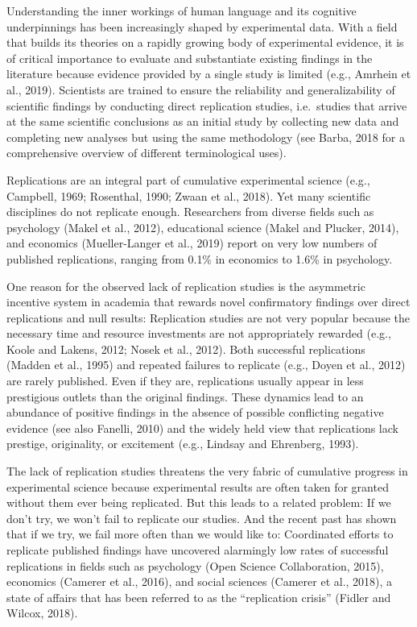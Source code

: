 \documentclass[]{elsarticle} %
\begin{document}
Understanding the inner workings of human language and its cognitive underpinnings has been increasingly shaped by experimental data. With a field that builds its theories on a rapidly growing body of experimental evidence, it is of critical importance to evaluate and substantiate existing findings in the literature because evidence provided by a single study is limited (e.g., Amrhein et al., 2019). Scientists are trained to ensure the reliability and generalizability of scientific findings by conducting direct replication studies, i.e.~studies that arrive at the same scientific conclusions as an initial study by collecting new data and completing new analyses but using the same methodology (see Barba, 2018 for a comprehensive overview of different terminological uses).

Replications are an integral part of cumulative experimental science (e.g., Campbell, 1969; Rosenthal, 1990; Zwaan et al., 2018). Yet many scientific disciplines do not replicate enough. Researchers from diverse fields such as psychology (Makel et al., 2012), educational science (Makel and Plucker, 2014), and economics (Mueller-Langer et al., 2019) report on very low numbers of published replications, ranging from 0.1\% in economics to 1.6\% in psychology.

One reason for the observed lack of replication studies is the asymmetric incentive system in academia that rewards novel confirmatory findings over direct replications and null results: Replication studies are not very popular because the necessary time and resource investments are not appropriately rewarded (e.g., Koole and Lakens, 2012; Nosek et al., 2012). Both successful replications (Madden et al., 1995) and repeated failures to replicate (e.g., Doyen et al., 2012) are rarely published. Even if they are, replications usually appear in less prestigious outlets than the original findings. These dynamics lead to an abundance of positive findings in the absence of possible conflicting negative evidence (see also Fanelli, 2010) and the widely held view that replications lack prestige, originality, or excitement (e.g., Lindsay and Ehrenberg, 1993).

The lack of replication studies threatens the very fabric of cumulative progress in experimental science because experimental results are often taken for granted without them ever being replicated. But this leads to a related problem: If we don't try, we won't fail to replicate our studies. And the recent past has shown that if we try, we fail more often than we would like to: Coordinated efforts to replicate published findings have uncovered alarmingly low rates of successful replications in fields such as psychology (Open Science Collaboration, 2015), economics (Camerer et al., 2016), and social sciences (Camerer et al., 2018), a state of affairs that has been referred to as the ``replication crisis'' (Fidler and Wilcox, 2018).
\end{document}
